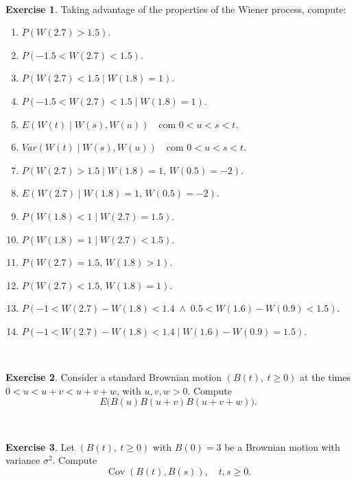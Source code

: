 \documentclass[
  11pt,
  a4paper,
]{book}
\theoremstyle{definition}
\theoremstyle{definition}
\theoremstyle{definition}
\newtheorem{exercise}{Exercise}[chapter]
\theoremstyle{definition}
\theoremstyle{remark}
\begin{document}
\(\,\)

\begin{exercise}

Taking advantage of the properties of the Wiener process, compute:

\begin{enumerate}
\def\labelenumi{\arabic{enumi}.}
\item
  \(P(W(2.7) > 1.5)\).
\item
  \(P(-1.5 < W(2.7) < 1.5)\).
\item
  \(P(W(2.7) < 1.5 \mid W(1.8) = 1)\).
\item
  \(P(-1.5 < W(2.7) < 1.5 \mid W(1.8) = 1)\).
\item
  \(E(W(t) \mid W(s), W(u)) \quad \text{com } 0 < u < s < t\).
\item
  \(Var(W(t) \mid W(s), W(u)) \quad \text{com } 0 < u < s < t\).
\item
  \(P(W(2.7) > 1.5 \mid W(1.8) = 1,\, W(0.5) = -2)\).
\item
  \(E(W(2.7) \mid W(1.8) = 1,\, W(0.5) = -2)\).
\item
  \(P(W(1.8) < 1 \mid W(2.7) = 1.5)\).
\item
  \(P(W(1.8) = 1 \mid W(2.7) < 1.5)\).
\item
  \(P(W(2.7) = 1.5,\, W(1.8) > 1)\).
\item
  \(P(W(2.7) < 1.5,\, W(1.8) = 1)\).
\item
  \(P(-1 < W(2.7) - W(1.8) < 1.4 \;\wedge\; 0.5 < W(1.6) - W(0.9) < 1.5)\).
\item
  \(P(-1 < W(2.7) - W(1.8) < 1.4 \mid W(1.6) - W(0.9) = 1.5)\).
\end{enumerate}

\end{exercise}

\(\,\)

\begin{exercise}
\leavevmode

Consider a standard Brownian motion \((B(t),~t\geq 0)\) at the times \(0<u<u+v<u+v+w\), with \(u,v,w>0\). Compute
\[
E\big(B(u)B(u+v)B(u+v+w)\big).
\]

\end{exercise}

\(\,\)

\begin{exercise}
\leavevmode

Let \((B(t),~t\geq 0)\) with \(B(0)=3\) be a Brownian motion with variance \(\sigma^{2}\). Compute
\[
\operatorname{Cov}(B(t),B(s)), \quad t,s \geq 0.
\]

\end{exercise}
\end{document}
